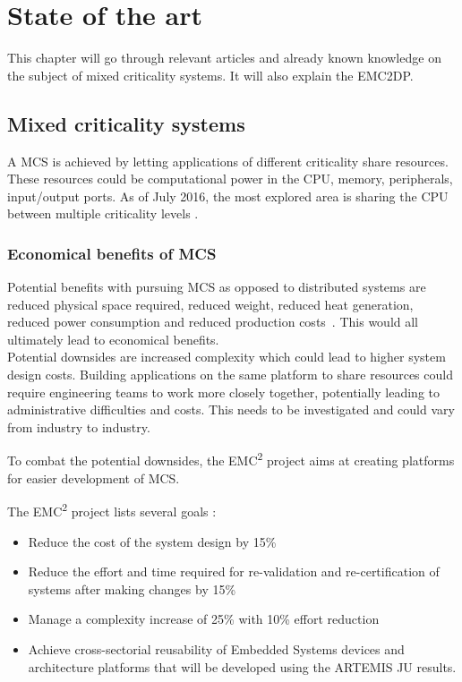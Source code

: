 \chapter{State of the art}
This chapter will go through relevant articles and already known knowledge on the subject of mixed criticality systems. It will also explain the EMC2DP.

\section{Mixed criticality systems}
A MCS is achieved by letting applications of different criticality share resources. These resources could be computational power in the CPU, memory, peripherals, input/output ports. As of July 2016, the most explored area is sharing the CPU between multiple criticality levels \cite{burns2016}. \\


\subsection{Economical benefits of MCS}
Potential benefits with pursuing MCS as opposed to distributed systems are reduced physical space required, reduced weight, reduced heat generation, reduced power consumption and reduced production costs~\cite{burns2016}. This would all ultimately lead to economical benefits.\\

Potential downsides are increased complexity which could lead to higher system design costs. Building applications on the same platform to share resources could require engineering teams to work more closely together, potentially leading to administrative difficulties and costs. This needs to be investigated and could vary from industry to industry.

To combat the potential downsides, the EMC\textsuperscript{2} project aims at creating platforms for easier development of MCS. %

The EMC\textsuperscript{2} project lists several goals \cite{website:emc2goals}:
\begin{itemize}
\item Reduce the cost of the system design by 15\%
\item Reduce the effort and time required for re-validation and re-certification of systems after making changes by 15\%
\item Manage a complexity increase of 25\% with 10\% effort reduction
\item Achieve cross-sectorial reusability of Embedded Systems devices and architecture platforms that will be developed using the ARTEMIS JU results.
\end{itemize}

